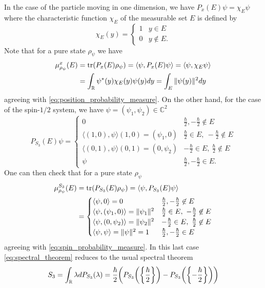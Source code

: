 \documentclass{article}
\begin{document}
In the case of the particle moving in one dimension, we have $P_x(E)\psi=\chi_E\psi$ where the characteristic function $\chi_E$ of the measurable set $E$ is defined by
\begin{equation}
\chi_E(y)=\begin{cases}
1 & y\in E\\
0 & y\not\in E.
\end{cases}
\end{equation}
Note that for a pure state $\rho_\psi$ we have
\begin{align}
\begin{split}
\mu^x_{\rho_\psi}(E)&=\tr(P_x(E)\rho_\psi)=\langle \psi,P_x(E)\psi\rangle=\langle\psi,\chi_E\psi\rangle\\
&=\int_\mathbb{R}\psi^*(y)\chi_E(y)\psi(y)dy=\int_E\|\psi(y)\|^2dy
\end{split}
\end{align}
agreeing with \eqref{eq:position_probability_measure}. On the other hand, for the case of the spin-$1/2$ system, we have $\psi=(\psi_1,\psi_2)\in\mathbb{C}^2$
\begin{equation}
P_{S_3}(E)\psi=\begin{cases}
0 & \frac{\hbar}{2},-\frac{\hbar}{2}\not\in E\\
\langle (1,0),\psi\rangle(1,0)=(\psi_1,0) & \frac{\hbar}{2}\in E, ~ -\frac{\hbar}{2}\not\in E\\
\langle (0,1),\psi\rangle(0,1)=(0,\psi_2) & -\frac{\hbar}{2}\in E, ~ \frac{\hbar}{2}\not\in E\\
\psi & \frac{\hbar}{2},-\frac{\hbar}{2}\in E.
\end{cases}
\end{equation}
One can then check that for a pure state $\rho_\psi$
\begin{align}
\begin{split}
\mu^{S_3}_{\rho_\psi}(E)&=\tr(P_{S_3}(E)\rho_\psi)=\langle\psi,P_{S_3}(E)\psi\rangle\\
&=\begin{cases}
\langle\psi,0\rangle = 0 & \frac{\hbar}{2},-\frac{\hbar}{2}\not\in E\\
\langle \psi,(\psi_1,0)\rangle = \|\psi_1\|^2 & \frac{\hbar}{2}\in E, ~ -\frac{\hbar}{2}\not\in E\\
\langle \psi,(0,\psi_2)\rangle = \|\psi_2\|^2 & -\frac{\hbar}{2}\in E, ~ \frac{\hbar}{2}\not\in E\\
\langle \psi,\psi\rangle = \|\psi\|^2 = 1 & \frac{\hbar}{2},-\frac{\hbar}{2}\in E
\end{cases}
\end{split}
\end{align}
agreeing with \eqref{eq:spin_probability_measure}. In this last case \eqref{eq:spectral_theorem} reduces to the usual spectral theorem
\begin{equation}
S_3=\int_\mathbb{R}\lambda dP_{S_3}(\lambda)=\frac{\hbar}{2}\qty(P_{S_3}\qty(\qty{\frac{\hbar}{2}})-P_{S_3}\qty(\qty{-\frac{\hbar}{2}}))
\end{equation}
\end{document}
